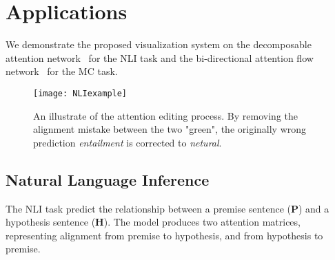 \section{Applications}
We demonstrate the proposed visualization system on the decomposable attention network~\cite{parikh2016emnlp}
for the NLI task and the bi-directional attention flow network~\cite{Seo2016} for the MC task.

\begin{figure*}[t]
\centering
\vspace{-2mm}
 \texttt{[image: NLIexample]}
  \vspace{-6mm}
 \caption{
An illustrate of the attention editing process. 
By removing the alignment mistake between the two "green", the originally wrong prediction \emph{entailment} is corrected to \emph{netural}.
}
\label{fig:NLIexample}
\end{figure*}

\subsection{Natural Language Inference}
\label{sec:NLIexample}
The NLI task predict the relationship between a premise sentence (\textbf{P}) and a hypothesis sentence (\textbf{H}).
The model produces two attention matrices, representing alignment from premise to hypothesis, and from hypothesis to premise.

